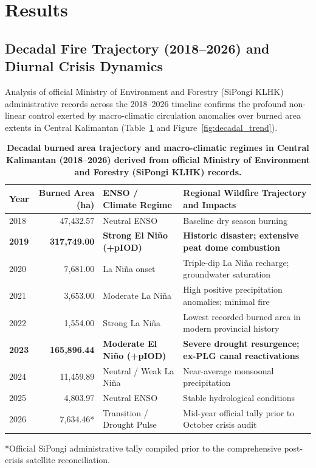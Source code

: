 \section{Results}
\label{sec:results}

\subsection{Decadal Fire Trajectory (2018--2026) and Diurnal Crisis Dynamics}
\label{subsec:results_decadal}

Analysis of official Ministry of Environment and Forestry (SiPongi KLHK) administrative records across the 2018--2026 timeline confirms the profound non-linear control exerted by macro-climatic circulation anomalies over burned area extents in Central Kalimantan (Table~\ref{tab:decadal_sipongi} and Figure~\ref{fig:decadal_trend}).

\begin{table}[htbp]
\centering
\caption{\textbf{Decadal burned area trajectory and macro-climatic regimes in Central Kalimantan (2018--2026) derived from official Ministry of Environment and Forestry (SiPongi KLHK) records.}}
\label{tab:decadal_sipongi}
\small
\begin{tabular}{lrll}
\toprule
\textbf{Year} & \textbf{Burned Area (ha)} & \textbf{ENSO / Climate Regime} & \textbf{Regional Wildfire Trajectory and Impacts} \\
\midrule
2018 & 47,432.57 & Neutral ENSO & Baseline dry season burning \\
\textbf{2019} & \textbf{317,749.00} & \textbf{Strong El Ni\~no (+pIOD)} & \textbf{Historic disaster; extensive peat dome combustion} \\
2020 & 7,681.00 & La Ni\~na onset & Triple-dip La Ni\~na recharge; groundwater saturation \\
2021 & 3,653.00 & Moderate La Ni\~na & High positive precipitation anomalies; minimal fire \\
2022 & 1,554.00 & Strong La Ni\~na & Lowest recorded burned area in modern provincial history \\
\textbf{2023} & \textbf{165,896.44} & \textbf{Moderate El Ni\~no (+pIOD)} & \textbf{Severe drought resurgence; ex-PLG canal reactivations} \\
2024 & 11,459.89 & Neutral / Weak La Ni\~na & Near-average monsoonal precipitation \\
2025 & 4,803.97 & Neutral ENSO & Stable hydrological conditions \\
2026 & 7,634.46* & Transition / Drought Pulse & Mid-year official tally prior to October crisis audit \\
\bottomrule
\end{tabular}
\flushleft
\footnotesize{*Official SiPongi administrative tally compiled prior to the comprehensive post-crisis satellite reconciliation.}
\end{table}

